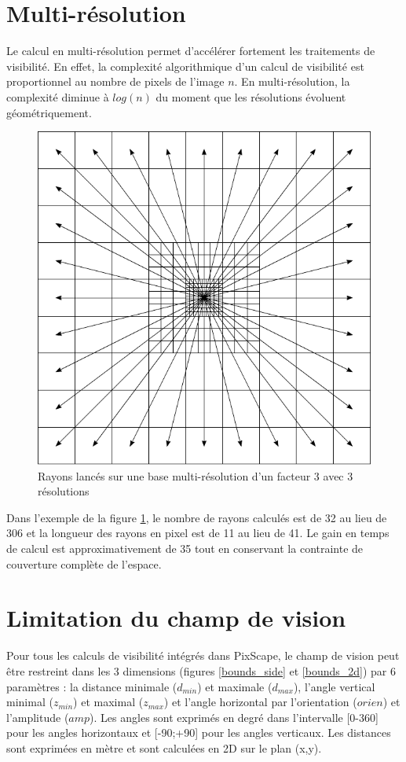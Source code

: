 \documentclass{report}
\begin{document}
\section{Multi-résolution}
\label{multires}
Le calcul en multi-résolution permet d'accélérer fortement les traitements de visibilité. En effet, la complexité algorithmique d'un calcul de visibilité est proportionnel au nombre de pixels de l'image $n$. En multi-résolution, la complexité diminue à $log(n)$ du moment que les résolutions évoluent géométriquement.

\begin{figure}[H]
	\includegraphics{img/grid_multi.pdf} 
	\caption{Rayons lancés sur une base multi-résolution d'un facteur 3 avec 3 résolutions}
	\label{grid_multi}
\end{figure}

Dans l'exemple de la figure \ref{grid_multi}, le nombre de rayons calculés est de 32 au lieu de 306 et la longueur des rayons en pixel est de 11 au lieu de 41. Le gain en temps de calcul est approximativement de 35 tout en conservant la contrainte de couverture complète de l'espace.


\section{Limitation du champ de vision}
\label{bounds}
Pour tous les calculs de visibilité intégrés dans PixScape, le champ de vision peut être restreint dans les 3 dimensions (figures \ref{bounds_side} et \ref{bounds_2d}) par 6 paramètres : la distance minimale ($d_{min}$) et maximale ($d_{max}$), l'angle vertical minimal ($z_{min}$) et maximal ($z_{max}$) et l'angle horizontal par l'orientation ($orien$) et l'amplitude ($amp$). Les angles sont exprimés en degré dans l'intervalle [0-360] pour les angles horizontaux et [-90;+90] pour les angles verticaux. Les distances sont exprimées en mètre et sont calculées en 2D sur le plan (x,y). 
\end{document}

